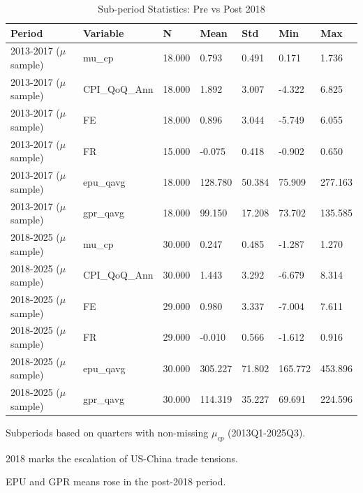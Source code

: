\begin{table}[!htbp]
    \centering
    \small
    \caption{Sub-period Statistics: Pre vs Post 2018}
    \label{tab:subperiod}
    \begin{threeparttable}
        \begin{tabular}{@{}lllllll@{}}
            \toprule
            Period                   & Variable      & N      & Mean    & Std    & Min     & Max     \\
            \midrule
            2013-2017 ($\mu$ sample) & mu\_cp        & 18.000 & 0.793   & 0.491  & 0.171   & 1.736   \\
            2013-2017 ($\mu$ sample) & CPI\_QoQ\_Ann & 18.000 & 1.892   & 3.007  & -4.322  & 6.825   \\
            2013-2017 ($\mu$ sample) & FE            & 18.000 & 0.896   & 3.044  & -5.749  & 6.055   \\
            2013-2017 ($\mu$ sample) & FR            & 15.000 & -0.075  & 0.418  & -0.902  & 0.650   \\
            2013-2017 ($\mu$ sample) & epu\_qavg     & 18.000 & 128.780 & 50.384 & 75.909  & 277.163 \\
            2013-2017 ($\mu$ sample) & gpr\_qavg     & 18.000 & 99.150  & 17.208 & 73.702  & 135.585 \\
            2018-2025 ($\mu$ sample) & mu\_cp        & 30.000 & 0.247   & 0.485  & -1.287  & 1.270   \\
            2018-2025 ($\mu$ sample) & CPI\_QoQ\_Ann & 30.000 & 1.443   & 3.292  & -6.679  & 8.314   \\
            2018-2025 ($\mu$ sample) & FE            & 29.000 & 0.980   & 3.337  & -7.004  & 7.611   \\
            2018-2025 ($\mu$ sample) & FR            & 29.000 & -0.010  & 0.566  & -1.612  & 0.916   \\
            2018-2025 ($\mu$ sample) & epu\_qavg     & 30.000 & 305.227 & 71.802 & 165.772 & 453.896 \\
            2018-2025 ($\mu$ sample) & gpr\_qavg     & 30.000 & 114.319 & 35.227 & 69.691  & 224.596 \\
            \bottomrule
        \end{tabular}
        \begin{tablenotes}[flushleft]
            \footnotesize
            \item Subperiods based on quarters with non-missing $\mu_{cp} $ (2013Q1-2025Q3).
            \item 2018 marks the escalation of US-China trade tensions.
            \item EPU and GPR means rose in the post-2018 period.
        \end{tablenotes}
    \end{threeparttable}
\end{table}
